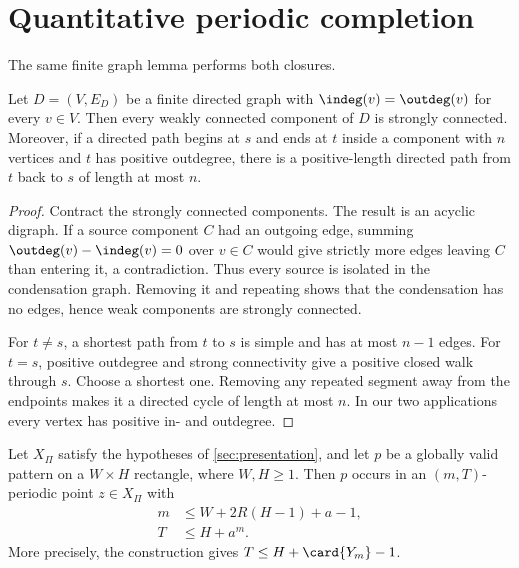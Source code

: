 \section{Quantitative periodic completion}\label{sec:completion}

The same finite graph lemma performs both closures.

\begin{lemma}\label{lem:balanced}
Let $D=(V,E_D)$ be a finite directed graph with
$\indeg(v)=\outdeg(v)$ for every $v\in V$.  Then every weakly connected component of $D$ is strongly connected.  Moreover, if a directed path begins at $s$ and ends at $t$ inside a component with $n$ vertices and $t$ has positive outdegree, there is a positive-length directed path from $t$ back to $s$ of length at most $n$.
\end{lemma}

\begin{proof}
Contract the strongly connected components.  The result is an acyclic digraph.  If a source component $C$ had an outgoing edge, summing
$\outdeg(v)-\indeg(v)=0$ over $v\in C$ would give strictly more edges leaving $C$ than entering it, a contradiction.  Thus every source is isolated in the condensation graph.  Removing it and repeating shows that the condensation has no edges, hence weak components are strongly connected.

For $t\neq s$, a shortest path from $t$ to $s$ is simple and has at most $n-1$ edges.  For $t=s$, positive outdegree and strong connectivity give a positive closed walk through $s$.  Choose a shortest one.  Removing any repeated segment away from the endpoints makes it a directed cycle of length at most $n$.  In our two applications every vertex has positive in- and outdegree.
\end{proof}

\begin{theorem}\label{thm:completion}
Let $X_\Pi$ satisfy the hypotheses of \cref{sec:presentation}, and let
$p$ be a globally valid pattern on a $W\times H$ rectangle, where
$W,H\geq1$.  Then $p$ occurs in an $(m,T)$-periodic point $z\in X_\Pi$ with
\begin{align}
 m&\leq W+2R(H-1)+a-1,\label{eq:m-bound}\\
 T&\leq H+a^m.\label{eq:T-bound}
\end{align}
More precisely, the construction gives $T\leq H+\card{Y_m}-1$.
\end{theorem}

